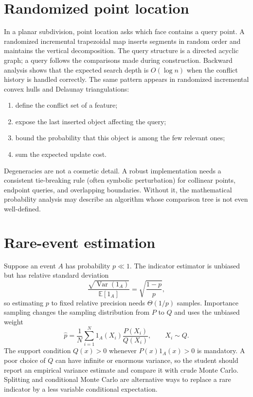 \section{Randomized point location}

In a planar subdivision, point location asks which face contains a query point.
A randomized incremental trapezoidal map inserts segments in random order and
maintains the vertical decomposition.  The query structure is a directed
acyclic graph; a query follows the comparisons made during construction.
Backward analysis shows that the expected search depth is $O(\log n)$ when
the conflict history is handled correctly.  The same pattern appears in
randomized incremental convex hulls and Delaunay triangulations:
\begin{enumerate}
\item define the conflict set of a feature;
\item expose the last inserted object affecting the query;
\item bound the probability that this object is among the few relevant ones;
\item sum the expected update cost.
\end{enumerate}
Degeneracies are not a cosmetic detail.  A robust implementation needs a
consistent tie-breaking rule (often symbolic perturbation) for collinear
points, endpoint queries, and overlapping boundaries.  Without it, the
mathematical probability analysis may describe an algorithm whose comparison
tree is not even well-defined.

\section{Rare-event estimation}

Suppose an event $A$ has probability $p\ll1$.  The indicator estimator is
unbiased but has relative standard deviation
\[
 \frac{\sqrt{\operatorname{Var}(1_A)}}{\mathbb E[1_A]}
 =\sqrt{\frac{1-p}{p}},
\]
so estimating $p$ to fixed relative precision needs $\Theta(1/p)$ samples.
Importance sampling changes the sampling distribution from $P$ to $Q$ and
uses the unbiased weight
\[
 \widehat p=\frac1N\sum_{i=1}^N
 1_A(X_i)\frac{P(X_i)}{Q(X_i)},\qquad X_i\sim Q.
\]
The support condition $Q(x)>0$ whenever $P(x)1_A(x)>0$ is mandatory.  A poor
choice of $Q$ can have infinite or enormous variance, so the student should
report an empirical variance estimate and compare it with crude Monte Carlo.
Splitting and conditional Monte Carlo are alternative ways to replace a rare
indicator by a less variable conditional expectation.

